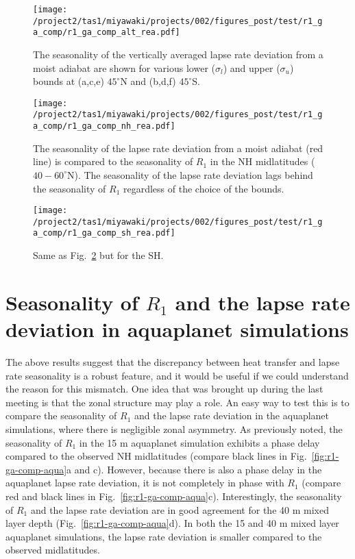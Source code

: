 \documentclass{article}
\begin{document}
\begin{figure}
    \centering
    \texttt{[image: /project2/tas1/miyawaki/projects/002/figures\_post/test/r1\_ga\_comp/r1\_ga\_comp\_alt\_rea.pdf]}
    \caption{The seasonality of the vertically averaged lapse rate deviation from a moist adiabat are shown for various lower ($\sigma_l$) and upper ($\sigma_u$) bounds at (a,c,e) $45^\circ$N and (b,d,f) $45^\circ$S.}
    \label{fig:r1-ga-comp-grid}
\end{figure}

\begin{figure}
    \texttt{[image: /project2/tas1/miyawaki/projects/002/figures\_post/test/r1\_ga\_comp/r1\_ga\_comp\_nh\_rea.pdf]}
    \caption{The seasonality of the lapse rate deviation from a moist adiabat (red line) is compared to the seasonality of $R_1$ in the NH midlatitudes ($40-60^\circ$N). The seasonality of the lapse rate deviation lags behind the seasonality of $R_1$ regardless of the choice of the bounds.}
    \label{fig:r1-ga-comp-grid-nh}
\end{figure}

\begin{figure}
    \texttt{[image: /project2/tas1/miyawaki/projects/002/figures\_post/test/r1\_ga\_comp/r1\_ga\_comp\_sh\_rea.pdf]}
    \caption{Same as Fig.~\ref{fig:r1-ga-comp-grid-nh} but for the SH.}
    \label{fig:r1-ga-comp-grid-sh}
\end{figure}

\section{Seasonality of $R_1$ and the lapse rate deviation in aquaplanet simulations}

The above results suggest that the discrepancy between heat transfer and lapse rate seasonality is a robust feature, and it would be useful if we could understand the reason for this mismatch. One idea that was brought up during the last meeting is that the zonal structure may play a role. An easy way to test this is to compare the seasonality of $R_1$ and the lapse rate deviation in the aquaplanet simulations, where there is negligible zonal asymmetry. As previously noted, the seasonality of $R_1$ in the 15 m aquaplanet simulation exhibits a phase delay compared to the observed NH midlatitudes (compare black lines in Fig.~\ref{fig:r1-ga-comp-aqua}a and c). However, because there is also a phase delay in the aquaplanet lapse rate deviation, it is not completely in phase with $R_1$ (compare red and black lines in Fig.~\ref{fig:r1-ga-comp-aqua}c). Interestingly, the seasonality of $R_1$ and the lapse rate deviation are in good agreement for the 40 m mixed layer depth (Fig.~\ref{fig:r1-ga-comp-aqua}d). In both the 15 and 40 m mixed layer aquaplanet simulations, the lapse rate deviation is smaller compared to the observed midlatitudes. 
\end{document}
